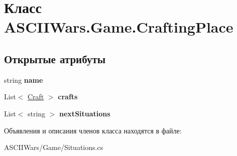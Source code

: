 \hypertarget{class_a_s_c_i_i_wars_1_1_game_1_1_crafting_place}{}\section{Класс A\+S\+C\+I\+I\+Wars.\+Game.\+Crafting\+Place}
\label{class_a_s_c_i_i_wars_1_1_game_1_1_crafting_place}
\subsection*{Открытые атрибуты}
\begin{DoxyCompactItemize}
\item 
\hypertarget{class_a_s_c_i_i_wars_1_1_game_1_1_crafting_place_a654552576280ed86d81e1c90fadb6ae6}{}\label{class_a_s_c_i_i_wars_1_1_game_1_1_crafting_place_a654552576280ed86d81e1c90fadb6ae6} 
string {\bfseries name}
\item 
\hypertarget{class_a_s_c_i_i_wars_1_1_game_1_1_crafting_place_a0eaea08a4003a6fcc22898b3245c92d4}{}\label{class_a_s_c_i_i_wars_1_1_game_1_1_crafting_place_a0eaea08a4003a6fcc22898b3245c92d4} 
List$<$ \hyperlink{class_a_s_c_i_i_wars_1_1_game_1_1_craft}{Craft} $>$ {\bfseries crafts}
\item 
\hypertarget{class_a_s_c_i_i_wars_1_1_game_1_1_crafting_place_a29294bd0619212b716e258dce38c89dc}{}\label{class_a_s_c_i_i_wars_1_1_game_1_1_crafting_place_a29294bd0619212b716e258dce38c89dc} 
List$<$ string $>$ {\bfseries next\+Situations}
\end{DoxyCompactItemize}


Объявления и описания членов класса находятся в файле\+:\begin{DoxyCompactItemize}
\item 
A\+S\+C\+I\+I\+Wars/\+Game/Situations.\+cs\end{DoxyCompactItemize}
